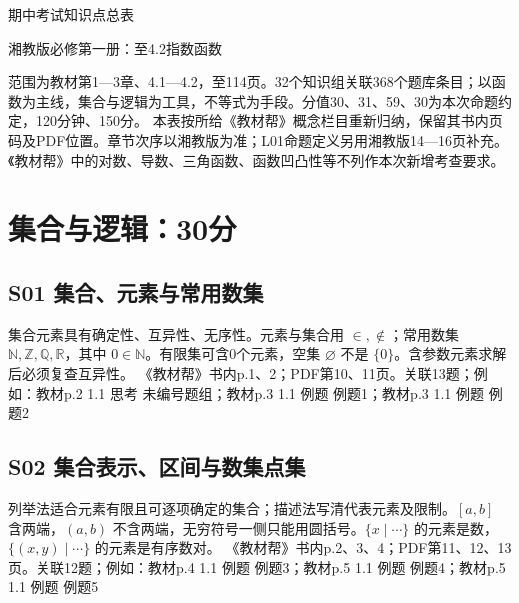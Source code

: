 

\begin{center}{\LARGE 期中考试知识点总表}\par\medskip 湘教版必修第一册：至4.2指数函数\end{center}
范围为教材第1—3章、4.1—4.2，至114页。32个知识组关联368个题库条目；以函数为主线，集合与逻辑为工具，不等式为手段。分值30、31、59、30为本次命题约定，120分钟、150分。
本表按所给《教材帮》概念栏目重新归纳，保留其书内页码及PDF位置。章节次序以湘教版为准；L01命题定义另用湘教版14—16页补充。《教材帮》中的对数、导数、三角函数、函数凹凸性等不列作本次新增考查要求。
\tableofcontents\clearpage
\section{集合与逻辑：30分}
\par\medskip\noindent\begin{minipage}{\linewidth}\subsection{S01 集合、元素与常用数集}
集合元素具有确定性、互异性、无序性。元素与集合用 $\in,\notin$；常用数集 $\mathbb N,\mathbb Z,\mathbb Q,\mathbb R$，其中 $0\in\mathbb N$。有限集可含0个元素，空集 $\varnothing$ 不是 $\{0\}$。含参数元素求解后必须复查互异性。
{\small 《教材帮》书内p.1、2；PDF第10、11页。关联13题；例如：教材p.2 1.1 思考 未编号题组；教材p.3 1.1 例题 例题1；教材p.3 1.1 例题 例题2}\par\end{minipage}\par
\par\medskip\noindent\begin{minipage}{\linewidth}\subsection{S02 集合表示、区间与数集点集}
列举法适合元素有限且可逐项确定的集合；描述法写清代表元素及限制。$[a,b]$ 含两端，$(a,b)$ 不含两端，无穷符号一侧只能用圆括号。$\{x\mid\cdots\}$ 的元素是数，$\{(x,y)\mid\cdots\}$ 的元素是有序数对。
{\small 《教材帮》书内p.2、3、4；PDF第11、12、13页。关联12题；例如：教材p.4 1.1 例题 例题3；教材p.5 1.1 例题 例题4；教材p.5 1.1 例题 例题5}\par\end{minipage}\par
